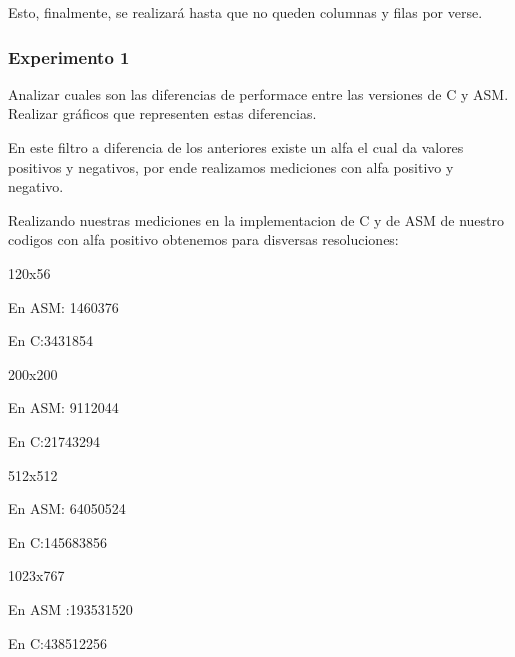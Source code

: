 Esto, finalmente, se realizará hasta que no queden columnas y filas por verse.



\vspace*{0.3cm} \noindent
\subsubsection{Experimento 1}

  Analizar cuales son las diferencias de performace entre las versiones de C y ASM. 
  Realizar gráficos que representen estas diferencias.
  
\vspace*{0.3cm} \noindent

 En este filtro a diferencia de los anteriores existe un alfa el cual da valores positivos y negativos,
 por ende realizamos mediciones con alfa positivo y negativo.
 \vspace*{0.3cm} \noindent
 
 Realizando nuestras mediciones en la implementacion de C y de ASM de nuestro codigos con alfa positivo 
 obtenemos para disversas resoluciones: \vspace*{0.3cm} \noindent
 
 
 120x56
 
En ASM: 1460376

En C:3431854

 \vspace*{0.3cm} \noindent
200x200

En ASM: 9112044

En C:21743294

 \vspace*{0.3cm} \noindent
512x512

En ASM: 64050524

En C:145683856

 \vspace*{0.3cm} \noindent
1023x767

En ASM :193531520

En C:438512256


  \vspace*{0.3cm}

